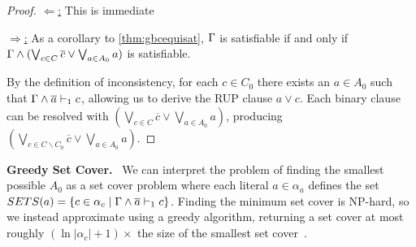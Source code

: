 \begin{proof}
    \underline{$\Leftarrow$:} This is immediate


    \underline{$\Rightarrow$:}  As a corollary to \autoref{thm:gbcequisat},
    $\Gamma$ is satisfiable if and only if $\Gamma \land (\bigvee_{c \in C}
    \overline{c} \lor \bigvee_{a \in A_0} a)$ is satisfiable.
    
    By the definition of inconsistency, for each $c \in C_0$ there exists an $a \in A_0$ such that $\Gamma \land \overline{a} \vdash_1 c$, 
    allowing us to derive the RUP clause  $a \lor c$. 
    Each binary clause can be resolved with $ (\bigvee_{c \in C}
    \overline{c} \lor \bigvee_{a \in A_0} a)$, producing  $(\bigvee_{c \in C \backslash C_0} \overline{c} \lor \bigvee_{a \in A_0} a)$. 
    

%
%
\end{proof}


%


\noindent \textbf{Greedy Set Cover.}~\label{subsec:sym} %
We can interpret the problem of finding the smallest possible $A_0$ as a set cover problem 
where each literal $a \in \alpha_a$ defines the set  $SETS(a) = \{ c \in \alpha_c \; | \; \Gamma \land \overline{a} \vdash_1 c\}$.
Finding the minimum set cover is NP-hard, so we instead approximate using a greedy algorithm, returning a set cover at most roughly $(\ln |\alpha_c| + 1)\times$ the size of the smallest set cover~\cite{greedysetcover}. 


